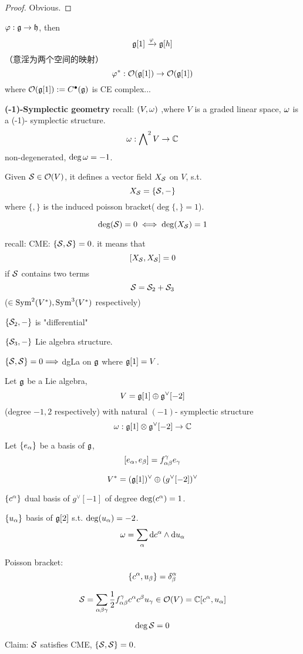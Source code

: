\begin{proof}
Obvious.
\end{proof}

$\varphi:\mathfrak{g}\to\mathfrak{h}$, then
$$\mathfrak{g}[1]\xrightarrow{\varphi}\mathfrak{g}[h]$$
（意淫为两个空间的映射）
$$\varphi^*:\mathcal{O}(\mathfrak{g}[1])\to\mathcal{O}(\mathfrak{g}[1])$$
where $\mathcal{O}(\mathfrak{g}[1]):=C^{\bullet}(\mathfrak{g})$ is CE complex...

\textbf{(-1)-Symplectic geometry}
recall: $(V,\omega)$ ,where $V$ is a graded linear space, $\omega$ is a (-1)- symplectic structure.
$$\omega:\bigwedge\nolimits^{2}V\to\mathbb{C}$$
non-degenerated, $\deg\omega=-1$.

Given $\mathcal{S}\in\mathcal{O}(V)$, it defines a vector field
$X_{\mathcal{S}}$ on $V$, s.t.
$$X_{\mathcal{S}}=\{\mathcal{S},-\}$$
where $\{,\}$ is the induced poisson bracket($\deg\{,\}=1$).

$$\deg(\mathcal{S})=0\iff\deg(X_{\mathcal{S}})=1$$

recall: CME: $\{\mathcal{S},\mathcal{S}\}=0$. it means that
$$[X_{\mathcal{S}},X_{\mathcal{S}}]=0$$
if $\mathcal{S}$ contains two terms
$$\mathcal{S}=\mathcal{S}_2+\mathcal{S}_3$$
($\in \operatorname{Sym}^2(V^*),\operatorname{Sym}^3(V^*)$ respectively)

$\{\mathcal{S}_2,-\}$ is "differential"

$\{\mathcal{S}_3,-\}$ Lie algebra structure.

$\{\mathcal{S},\mathcal{S}\}=0\Longrightarrow$ dgLa on $\mathfrak{g}$ where $\mathfrak{g}[1]=V$.

\begin{example}
Let $\mathfrak{g}$ be a Lie algebra,
$$V=\mathfrak{g}[1]\oplus\mathfrak{g}^\vee[-2]$$
(degree $-1,2$ respectively)
with natural $(-1)$- symplectic structure
$$\omega:\mathfrak{g}[1]\otimes \mathfrak{g}^\vee[-2]\to\mathbb{C}$$


Let $\{e_\alpha\}$ be a basis of $\mathfrak{g}$,
$$[e_\alpha,e_\beta]=f^\gamma_{\alpha\beta}e_\gamma$$

$$V^*=(\mathfrak{g}[1])^\vee\oplus(g^\vee[-2])^\vee$$

$\{c^\alpha\}$ dual basis of $g^\vee[-1]$ of degree $\deg(c^\alpha)=1$.

$\{u_\alpha\}$ basis of $\mathfrak{g}[2]$ s.t. $\deg(u_\alpha)=-2$.
$$\omega=\sum_{\alpha}\mathrm{d} c^\alpha\wedge\mathrm{d} u_\alpha$$
\end{example}

Poisson bracket:
$$\{c^\alpha,u_\beta\}=\delta^\alpha_\beta$$

$$\mathcal{S}=\sum_{\alpha\beta\gamma}
\frac{1}{2}f_{\alpha\beta}^\gamma c^\alpha c^\beta u_\gamma
\in\mathcal{O}(V)=\mathbb{C}[c^\alpha,u_\alpha]
$$

$$\deg\mathcal{S}=0$$

Claim: $\mathcal{S}$ satisfies CME, $\{\mathcal{S},\mathcal{S}\}=0$.

